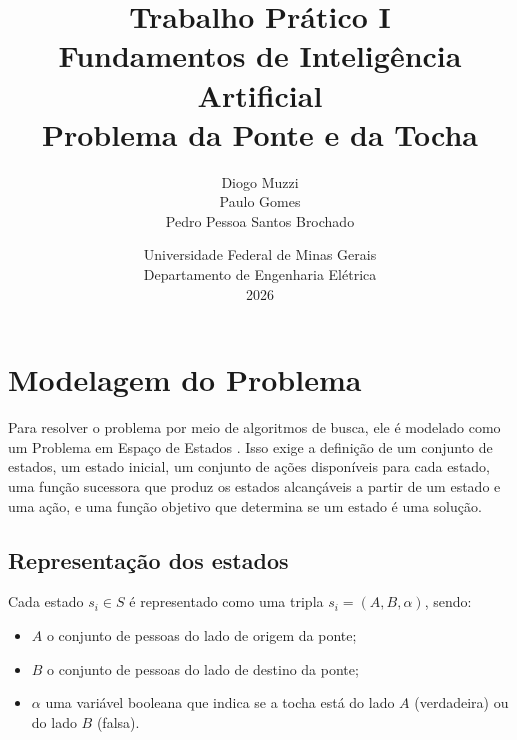 \documentclass[12pt,a4paper]{article}
\title{
    \textbf{Trabalho Prático I}\\
    Fundamentos de Inteligência Artificial\\
    Problema da Ponte e da Tocha
}
\author{
    Diogo Muzzi \\
    Paulo Gomes \\
    Pedro Pessoa Santos Brochado
}
\date{
    Universidade Federal de Minas Gerais\\
    Departamento de Engenharia Elétrica\\
    2026
}
\begin{document}

\maketitle
\thispagestyle{empty}


\newpage


\tableofcontents


\newpage




\section{Modelagem do Problema}
\label{sec:modelagem}

Para resolver o problema por meio de algoritmos de busca, ele é modelado como
um Problema em Espaço de Estados \parencite{poole2010}. Isso exige a definição
de um conjunto de estados, um estado inicial, um conjunto de ações disponíveis
para cada estado, uma função sucessora que produz os estados alcançáveis a
partir de um estado e uma ação, e uma função objetivo que determina se um
estado é uma solução.

\subsection{Representação dos estados}

Cada estado $s_i \in S$ é representado como uma tripla $s_i = (A, B, \alpha)$,
sendo:
\begin{itemize}
    \item $A$ o conjunto de pessoas do lado de origem da ponte;
    \item $B$ o conjunto de pessoas do lado de destino da ponte;
    \item $\alpha$ uma variável booleana que indica se a tocha está do lado
    $A$ (verdadeira) ou do lado $B$ (falsa).
\end{itemize}
\end{document}

